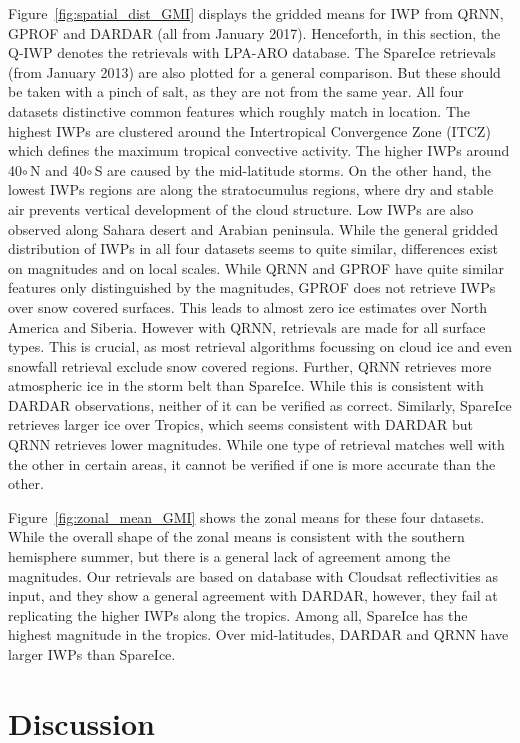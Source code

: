 \documentclass[amt, manuscript]{copernicus}
\begin{document}
Figure~\ref{fig:spatial_dist_GMI} displays the gridded means for IWP from QRNN, GPROF and DARDAR (all from January 2017). Henceforth, in this section, the Q-IWP denotes the retrievals with LPA-ARO database. The SpareIce retrievals (from January 2013) are also plotted for a general comparison. But these should be taken with a pinch of salt, as they are not from the same year. All four datasets distinctive common features which roughly match in location. The highest IWPs are clustered around the Intertropical  Convergence Zone (ITCZ) which defines the maximum tropical convective activity. The higher IWPs around 40$\circ$\,N and 40$\circ$\,S are caused by the mid-latitude storms. On the other hand, the lowest IWPs regions are along the stratocumulus regions, where dry and stable air prevents vertical development of the cloud structure. Low IWPs are also observed along Sahara desert and Arabian peninsula. While the general gridded distribution of IWPs in all four datasets seems to quite similar, differences exist on magnitudes and on local scales. While QRNN and GPROF have quite similar features only distinguished by the magnitudes, GPROF does not retrieve IWPs over snow covered surfaces. This leads to almost zero ice estimates over North America and Siberia. However with QRNN, retrievals are made for all surface types. This is crucial, as most retrieval algorithms focussing on cloud ice and even snowfall retrieval \citep{rysman:slalom:18} exclude snow covered regions. Further, QRNN retrieves more atmospheric ice in the storm belt than SpareIce. While this is consistent with DARDAR observations, neither of it can be verified as correct. Similarly, SpareIce retrieves larger ice over Tropics, which seems consistent with DARDAR but QRNN retrieves lower magnitudes. While one type of retrieval matches well with the other in certain areas, it cannot be verified if one is more accurate than the other.  


Figure~\ref{fig:zonal_mean_GMI} shows the zonal means for these four datasets. While the overall shape of the zonal means is consistent with the southern hemisphere summer, but there is a general lack of agreement among the magnitudes. Our retrievals are based on database with Cloudsat reflectivities as input, and they show a general agreement with DARDAR, however, they fail at replicating the higher IWPs along the tropics. Among all, SpareIce has the highest magnitude in the tropics. Over mid-latitudes, DARDAR and QRNN have larger IWPs than SpareIce.   


\section{Discussion}
\end{document}
